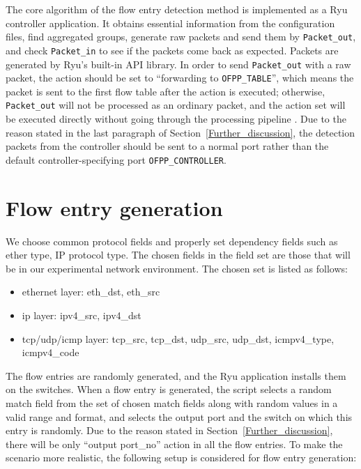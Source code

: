 The core algorithm of the flow entry detection method is implemented as a Ryu controller application. It obtains essential information from the configuration files, find aggregated groups, generate raw packets and send them by \texttt{Packet\_out}, and check \texttt{Packet\_in} to see if the packets come back as expected. Packets are generated by Ryu's built-in API library. In order to send \texttt{Packet\_out} with a raw packet, the action should be set to ``forwarding to \texttt{OFPP\_TABLE}'', which means the packet is sent to the first flow table after the action is executed; otherwise, \texttt{Packet\_out} will not be processed as an ordinary packet, and the action set will be executed directly without going through the processing pipeline \cite{PACKETOUT}. Due to the reason stated in the last paragraph of Section~\ref{Further_discussion}, the detection packets from the controller should be sent to a normal port rather than the default controller-specifying port \texttt{OFPP\_CONTROLLER}. 

\section{Flow entry generation}
\label{flow_entry_generation}
We choose common protocol fields and properly set dependency fields such as ether type, IP protocol type. The chosen fields in the field set are those that will be in our experimental network environment. The chosen set is listed as follows:

\begin{itemize}
\item
ethernet layer: eth\_dst, eth\_src
\item
ip layer: ipv4\_src, ipv4\_dst
\item
tcp/udp/icmp layer: tcp\_src, tcp\_dst, udp\_src, udp\_dst, icmpv4\_type, icmpv4\_code
\end{itemize}

The flow entries are randomly generated, and the Ryu application installs them on the switches. When a flow entry is generated, the script selects a random match field from the set of chosen match fields along with random values in a valid range and format, and selects the output port and the switch on which this entry is randomly. Due to the reason stated in Section~\ref{Further_discussion}, there will be only ``output port\_no'' action in all the flow entries. To make the scenario more realistic, the following setup is considered for flow entry generation:

